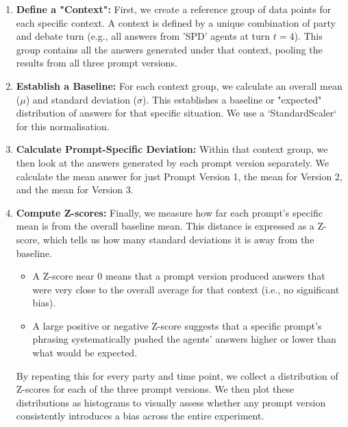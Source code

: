 \begin{enumerate}
    \item  \textbf{Define a "Context":} First, we create a reference group of data points for each specific context. A context is defined by a unique combination of party and debate turn (e.g., all answers from 'SPD' agents at turn $t=4$). This group contains all the answers generated under that context, pooling the results from all three prompt versions.

    \item  \textbf{Establish a Baseline:} For each context group, we calculate an overall mean ($\mu$) and standard deviation ($\sigma$). This establishes a baseline or "expected" distribution of answers for that specific situation. We use a `StandardScaler` for this normalisation.

    \item \textbf{Calculate Prompt-Specific Deviation:} Within that context group, we then look at the answers generated by each prompt version separately. We calculate the mean answer for just Prompt Version 1, the mean for Version 2, and the mean for Version 3.

    \item \textbf{Compute Z-scores:} Finally, we measure how far each prompt's specific mean is from the overall baseline mean. This distance is expressed as a Z-score, which tells us how many standard deviations it is away from the baseline.
    \begin{itemize}
        \item A Z-score near 0 means that a prompt version produced answers that were very close to the overall average for that context (i.e., no significant bias).
        \item A large positive or negative Z-score suggests that a specific prompt's phrasing systematically pushed the agents' answers higher or lower than what would be expected.
    \end{itemize}
    By repeating this for every party and time point, we collect a distribution of Z-scores for each of the three prompt versions. We then plot these distributions as histograms to visually assess whether any prompt version consistently introduces a bias across the entire experiment.
\end{enumerate}

